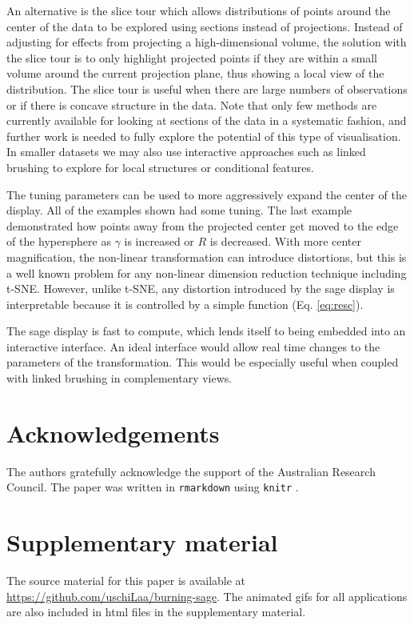 \documentclass[]{interact}
\theoremstyle{plain}%
\theoremstyle{definition}
\theoremstyle{remark}
\begin{document}
An alternative is the slice tour \citep{sliceTour} which allows
distributions of points around the center of the data to be explored
using sections instead of projections. Instead of adjusting for effects
from projecting a high-dimensional volume, the solution with the slice
tour is to only highlight projected points if they are within a small
volume around the current projection plane, thus showing a local view of
the distribution. The slice tour is useful when there are large numbers
of observations or if there is concave structure in the data. Note that
only few methods are currently available for looking at sections of the
data in a systematic fashion, and further work is needed to fully
explore the potential of this type of visualisation. In smaller datasets
we may also use interactive approaches such as linked brushing to
explore for local structures or conditional features.

The tuning parameters can be used to more aggressively expand the center
of the display. All of the examples shown had some tuning. The last
example demonstrated how points away from the projected center get moved
to the edge of the hypersphere as \(\gamma\) is increased or \(R\) is
decreased. With more center magnification, the non-linear transformation
can introduce distortions, but this is a well known problem for any
non-linear dimension reduction technique including t-SNE. However,
unlike t-SNE, any distortion introduced by the sage display is
interpretable because it is controlled by a simple function (Eq.
\ref{eq:resc}).

The sage display is fast to compute, which lends itself to being
embedded into an interactive interface. An ideal interface would allow
real time changes to the parameters of the transformation. This would be
especially useful when coupled with linked brushing in complementary
views.

\hypertarget{acknowledgements}{%
\section*{Acknowledgements}\label{acknowledgements}}

The authors gratefully acknowledge the support of the Australian
Research Council. The paper was written in \texttt{rmarkdown}
\citep{rmarkdown} using \texttt{knitr} \citep{knitr}.

\hypertarget{supplementary-material}{%
\section*{Supplementary material}\label{supplementary-material}}

The source material for this paper is available at
\url{https://github.com/uschiLaa/burning-sage}. The animated gifs for
all applications are also included in html files in the supplementary
material.



\end{document}
